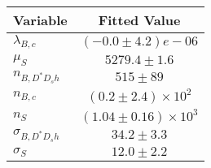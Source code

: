 \begin{tabular}[t]{lc}
\hline
Variable &Fitted Value\\
\hline\hline
$\lambda_{B,c}$&$(-0.0\pm4.2)e-06$\\
\hline
$\mu_S$&$5279.4\pm1.6$\\
\hline
$n_{B, D^* D_s h}$&$515\pm89$\\
\hline
$n_{B,c}$&$(0.2\pm2.4)\times 10^2$\\
\hline
$n_S$&$(1.04\pm0.16)\times 10^3$\\
\hline
$\sigma_{B, D^* D_s h}$&$34.2\pm3.3$\\
\hline
$\sigma_S$&$12.0\pm2.2$\\
\hline
\end{tabular}